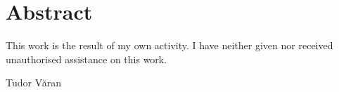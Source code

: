 \chapter*{Abstract}
\thispagestyle{empty}
\addtocounter{page}{-1}


This work is the result of my own activity. I have neither given nor received unauthorised assistance on this work.

\begin{flushright}
Tudor V\u{a}ran
\end{flushright}